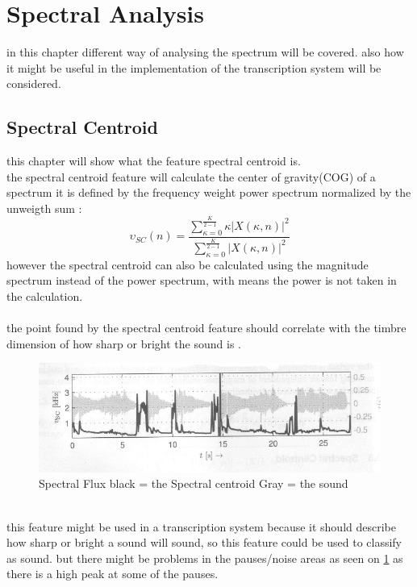 \section{Spectral Analysis}
in this chapter different way of analysing the spectrum will be covered. also how it might be useful in the implementation of the transcription system will be considered.
\subsection{Spectral Centroid}
this chapter will show what the feature spectral centroid is.\\
the spectral centroid feature will calculate the center of gravity(COG) of a spectrum it is defined by the frequency weight power spectrum normalized by the unweigth sum \citep{ACA}:
\begin{equation}\label{Spectral Centroid eq}
	\upsilon_{SC}(n) = \frac{\displaystyle\sum_{\kappa = 0}^{\frac{K}{2-1}} \kappa\vert X(\kappa,n) \vert^2}{\displaystyle\sum_{\kappa = 0}^{\frac{K}{2-1}} \vert X(\kappa,n) \vert^2 }    
\end{equation} 
however the spectral centroid can also be calculated using the magnitude spectrum instead of the power spectrum, with means the power is not taken in the calculation\citep{ACA}.\\
\\
the point found by the spectral centroid feature should correlate with the timbre dimension of how sharp or bright the sound is \citep{ACA}.\\
\begin{figure}[h]
	\begin{center}
		\includegraphics[scale = 0.5]{fig/spectral_centroid.jpg}
		\caption{Spectral Flux black = the Spectral centroid Gray = the sound}
		\label{Spectral slope pic}
	\end{center}
\end{figure}
\\
this feature might be used in a transcription system because it should describe how sharp or bright a sound will sound, so this feature could be used to classify as sound. but there might be problems in the pauses/noise areas as seen on \ref{Spectral slope pic} as there is a high peak at some of the pauses. 
